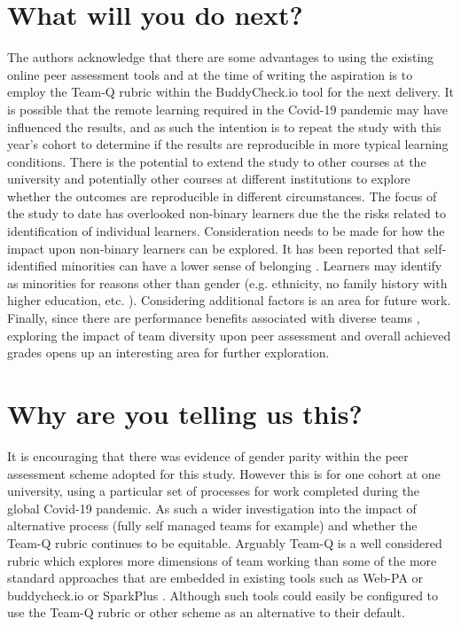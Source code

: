 \documentclass[sigconf, anonymous=true]{acmart}
\begin{document}
\section{What will you do next?}
The authors acknowledge that there are some advantages to using the existing online peer assessment tools and at the time of writing the aspiration is to employ the Team-Q rubric within the BuddyCheck.io tool for the next delivery. It is possible that the remote learning required in the Covid-19 pandemic may have influenced the results, and as such the intention is to repeat the study with this year's cohort to determine if the results are reproducible in more typical learning conditions. There is the potential to extend the study to other courses at the university and potentially other courses at different institutions to explore whether the outcomes are reproducible in different circumstances. The focus of the study to date has overlooked non-binary learners due the the risks related to identification of individual learners. Consideration needs to be made for how the impact upon non-binary learners can be explored. It has been reported that self-identified minorities can have a lower sense of belonging \cite{Mooney2020}. Learners may identify as minorities for reasons other than gender (e.g. ethnicity, no family history with higher education, etc. ). Considering additional factors is an area for future work. Finally, since there are performance benefits associated with diverse teams \cite{HBR206}, exploring the impact of team diversity upon peer assessment and overall achieved grades opens up an interesting area for further exploration.


\section{Why are you telling us this?}
It is encouraging that there was evidence of gender parity within the peer assessment scheme adopted for this study. However this is for one cohort at one university, using a particular set of processes for work completed during the global Covid-19 pandemic. As such a wider investigation into the impact of alternative process (fully self managed teams for example) and whether the Team-Q rubric continues to be equitable. Arguably Team-Q is a well considered rubric which explores more dimensions of team working than some of the more standard approaches that are embedded in existing tools such as Web-PA \cite{WebPA} or buddycheck.io \cite{BuddyCheck} or SparkPlus \cite{SparkPlus}. Although such tools could easily be configured to use the Team-Q rubric or other scheme as an alternative to their default.
\end{document}

